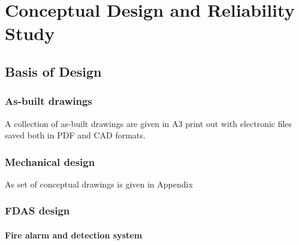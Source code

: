 \chapter{Conceptual Design and Reliability Study} %
\label{Chapter6}
%
\section{Basis of Design}
\subsection{As-built drawings}
A collection of as-built drawings are given in A3 print out with electronic files saved both in PDF and CAD formats.
\subsection{Mechanical design}
As set of conceptual drawings is given in Appendix %
\subsection{FDAS design}
\subsubsection{Fire alarm and detection system}
